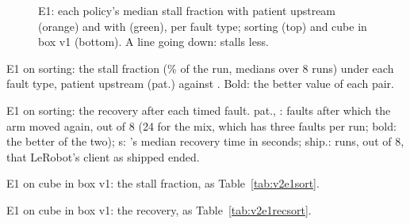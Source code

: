 \begin{figure}[htbp]
  \centering
  \par\medskip
  \caption{E1: each policy's median stall fraction with patient upstream (orange) and with \drtc{} (green), per
           fault type; sorting (top) and cube in box v1 (bottom). A line going down: \drtc{} stalls less.}
  \label{fig:v2e1}
\end{figure}

\begin{table}[htbp]
  \centering
  \small
  \begin{adjustbox}{max width=\textwidth}
  \end{adjustbox}
  \caption{E1 on sorting: the stall fraction (\% of the run, medians over 8 runs) under each fault type, patient
           upstream (pat.) against \drtc. Bold: the better value of each pair.}\label{tab:v2e1sort}
\end{table}

\begin{table}[htbp]
  \centering
  \small
  \setlength{\tabcolsep}{2.6pt}
  \begin{adjustbox}{max width=\textwidth}
  \end{adjustbox}
  \caption{E1 on sorting: the recovery after each timed fault. pat., \drtc: faults after which the arm moved again,
           out of 8 (24 for the mix, which has three faults per run; bold: the better of the two); s: \drtc's median
           recovery time in seconds; ship.: runs, out of 8, that LeRobot's client as shipped ended.}\label{tab:v2e1recsort}
\end{table}

\begin{table}[htbp]
  \centering
  \small
  \begin{adjustbox}{max width=\textwidth}
  \end{adjustbox}
  \caption{E1 on cube in box v1: the stall fraction, as Table~\ref{tab:v2e1sort}.}\label{tab:v2e1cube}
\end{table}

\begin{table}[htbp]
  \centering
  \small
  \setlength{\tabcolsep}{2.6pt}
  \begin{adjustbox}{max width=\textwidth}
  \end{adjustbox}
  \caption{E1 on cube in box v1: the recovery, as Table~\ref{tab:v2e1recsort}.}\label{tab:v2e1reccube}
\end{table}


